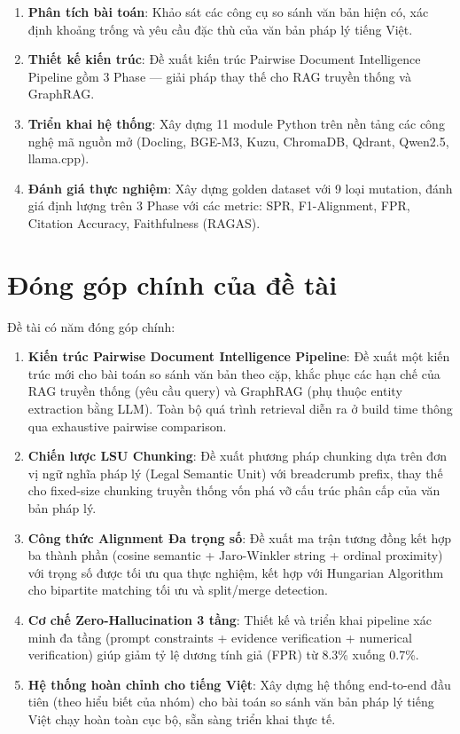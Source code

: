 \begin{enumerate}[label=(\arabic*)]
    \item \textbf{Phân tích bài toán}: Khảo sát các công cụ so sánh văn bản hiện có, xác định khoảng trống và yêu cầu đặc thù của văn bản pháp lý tiếng Việt.
    \item \textbf{Thiết kế kiến trúc}: Đề xuất kiến trúc Pairwise Document Intelligence Pipeline gồm 3 Phase — giải pháp thay thế cho RAG truyền thống và GraphRAG.
    \item \textbf{Triển khai hệ thống}: Xây dựng 11 module Python trên nền tảng các công nghệ mã nguồn mở (Docling, BGE-M3, Kuzu, ChromaDB, Qdrant, Qwen2.5, llama.cpp).
    \item \textbf{Đánh giá thực nghiệm}: Xây dựng golden dataset với 9 loại mutation, đánh giá định lượng trên 3 Phase với các metric: SPR, F1-Alignment, FPR, Citation Accuracy, Faithfulness (RAGAS).
\end{enumerate}

\section{Đóng góp chính của đề tài}

Đề tài có năm đóng góp chính:

\begin{enumerate}[label=(\arabic*)]
    \item \textbf{Kiến trúc Pairwise Document Intelligence Pipeline}: Đề xuất một kiến trúc mới cho bài toán so sánh văn bản theo cặp, khắc phục các hạn chế của RAG truyền thống (yêu cầu query) và GraphRAG (phụ thuộc entity extraction bằng LLM). Toàn bộ quá trình retrieval diễn ra ở build time thông qua exhaustive pairwise comparison.

    \item \textbf{Chiến lược LSU Chunking}: Đề xuất phương pháp chunking dựa trên đơn vị ngữ nghĩa pháp lý (Legal Semantic Unit) với breadcrumb prefix, thay thế cho fixed-size chunking truyền thống vốn phá vỡ cấu trúc phân cấp của văn bản pháp lý.

    \item \textbf{Công thức Alignment Đa trọng số}: Đề xuất ma trận tương đồng kết hợp ba thành phần (cosine semantic + Jaro-Winkler string + ordinal proximity) với trọng số được tối ưu qua thực nghiệm, kết hợp với Hungarian Algorithm cho bipartite matching tối ưu và split/merge detection.

    \item \textbf{Cơ chế Zero-Hallucination 3 tầng}: Thiết kế và triển khai pipeline xác minh đa tầng (prompt constraints + evidence verification + numerical verification) giúp giảm tỷ lệ dương tính giả (FPR) từ 8.3\% xuống 0.7\%.

    \item \textbf{Hệ thống hoàn chỉnh cho tiếng Việt}: Xây dựng hệ thống end-to-end đầu tiên (theo hiểu biết của nhóm) cho bài toán so sánh văn bản pháp lý tiếng Việt chạy hoàn toàn cục bộ, sẵn sàng triển khai thực tế.
\end{enumerate}

